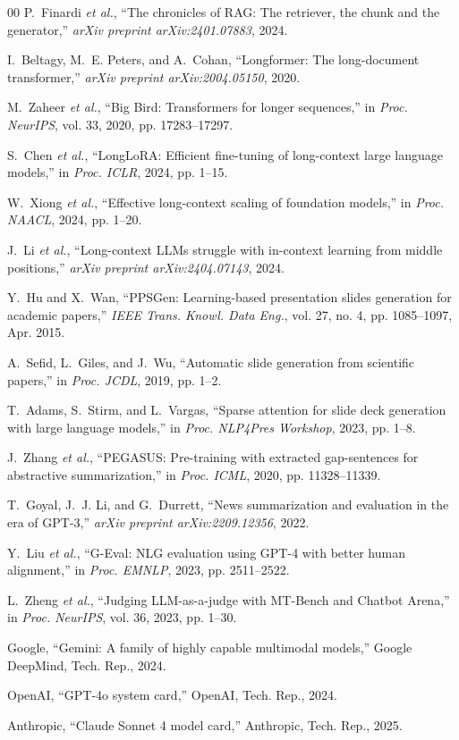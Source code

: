 \documentclass{ieeeaccess}
\begin{document}
\begin{thebibliography}{00}
 P.~Finardi \emph{et al.}, ``The chronicles of RAG: The retriever, the chunk and the generator,'' \emph{arXiv preprint arXiv:2401.07883}, 2024.

 I.~Beltagy, M.~E. Peters, and A.~Cohan, ``Longformer: The long-document transformer,'' \emph{arXiv preprint arXiv:2004.05150}, 2020.

 M.~Zaheer \emph{et al.}, ``Big Bird: Transformers for longer sequences,'' in \emph{Proc. NeurIPS}, vol. 33, 2020, pp. 17283--17297.

 S.~Chen \emph{et al.}, ``LongLoRA: Efficient fine-tuning of long-context large language models,'' in \emph{Proc. ICLR}, 2024, pp. 1--15.

 W.~Xiong \emph{et al.}, ``Effective long-context scaling of foundation models,'' in \emph{Proc. NAACL}, 2024, pp. 1--20.

 J.~Li \emph{et al.}, ``Long-context LLMs struggle with in-context learning from middle positions,'' \emph{arXiv preprint arXiv:2404.07143}, 2024.

 Y.~Hu and X.~Wan, ``PPSGen: Learning-based presentation slides generation for academic papers,'' \emph{IEEE Trans. Knowl. Data Eng.}, vol. 27, no. 4, pp. 1085--1097, Apr. 2015.

 A.~Sefid, L.~Giles, and J.~Wu, ``Automatic slide generation from scientific papers,'' in \emph{Proc. JCDL}, 2019, pp. 1--2.

 T.~Adams, S.~Stirm, and L.~Vargas, ``Sparse attention for slide deck generation with large language models,'' in \emph{Proc. NLP4Pres Workshop}, 2023, pp. 1--8.

 J.~Zhang \emph{et al.}, ``PEGASUS: Pre-training with extracted gap-sentences for abstractive summarization,'' in \emph{Proc. ICML}, 2020, pp. 11328--11339.

 T.~Goyal, J.~J. Li, and G.~Durrett, ``News summarization and evaluation in the era of GPT-3,'' \emph{arXiv preprint arXiv:2209.12356}, 2022.

 Y.~Liu \emph{et al.}, ``G-Eval: NLG evaluation using GPT-4 with better human alignment,'' in \emph{Proc. EMNLP}, 2023, pp. 2511--2522.

 L.~Zheng \emph{et al.}, ``Judging LLM-as-a-judge with MT-Bench and Chatbot Arena,'' in \emph{Proc. NeurIPS}, vol. 36, 2023, pp. 1--30.

 Google, ``Gemini: A family of highly capable multimodal models,'' Google DeepMind, Tech. Rep., 2024.

 OpenAI, ``GPT-4o system card,'' OpenAI, Tech. Rep., 2024.

 Anthropic, ``Claude Sonnet 4 model card,'' Anthropic, Tech. Rep., 2025.

\end{thebibliography}
\end{document}
